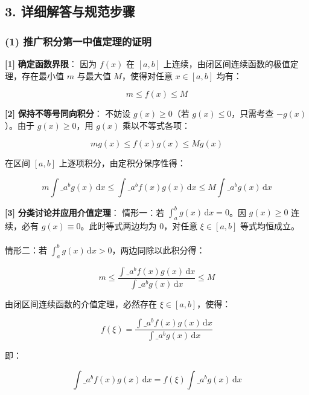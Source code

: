 \documentclass[11pt,a4paper,UTF8]{ctexart}
\begin{document}
\subsection{3. 详细解答与规范步骤}


\subsubsection{(1) 推广积分第一中值定理的证明}
\begin{solbox}[分步推导与答题规范]
\textbf{[1]}  \textbf{确定函数界限}：
因为 $f(x)$ 在 $[a, b]$ 上连续，由闭区间连续函数的极值定理，存在最小值 $m$ 与最大值 $M$，使得对任意 $x \in [a, b]$ 均有：

\begin{equation*}
m \le f(x) \le M
\end{equation*}


\textbf{[2]}  \textbf{保持不等号同向积分}：
不妨设 $g(x) \ge 0$（若 $g(x) \le 0$，只需考查 $-g(x)$）。由于 $g(x) \ge 0$，用 $g(x)$ 乘以不等式各项：

\begin{equation*}
m g(x) \le f(x)g(x) \le M g(x)
\end{equation*}

在区间 $[a, b]$ 上逐项积分，由定积分保序性得：

\begin{equation*}
m \int\_a^b g(x)\,\mathrm{d}x \le \int\_a^b f(x)g(x)\,\mathrm{d}x \le M \int\_a^b g(x)\,\mathrm{d}x
\end{equation*}


\textbf{[3]}  \textbf{分类讨论并应用介值定理}：
情形一：若 $\int_a^b g(x)\,\mathrm{d}x = 0$。因 $g(x) \ge 0$ 连续，必有 $g(x) \equiv 0$。此时等式两边均为 $0$，对任意 $\xi \in [a, b]$ 等式均恒成立。\\ \\
情形二：若 $\int_a^b g(x)\,\mathrm{d}x > 0$，两边同除以此积分得：

\begin{equation*}
m \le \frac{\int\_a^b f(x)g(x)\,\mathrm{d}x}{\int\_a^b g(x)\,\mathrm{d}x} \le M
\end{equation*}

由闭区间连续函数的介值定理，必然存在 $\xi \in [a, b]$，使得：

\begin{equation*}
f(\xi) = \frac{\int\_a^b f(x)g(x)\,\mathrm{d}x}{\int\_a^b g(x)\,\mathrm{d}x}
\end{equation*}

即：

\begin{equation*}
\int\_a^b f(x)g(x)\,\mathrm{d}x = f(\xi)\int\_a^b g(x)\,\mathrm{d}x
\end{equation*}

\end{solbox}
\end{document}

